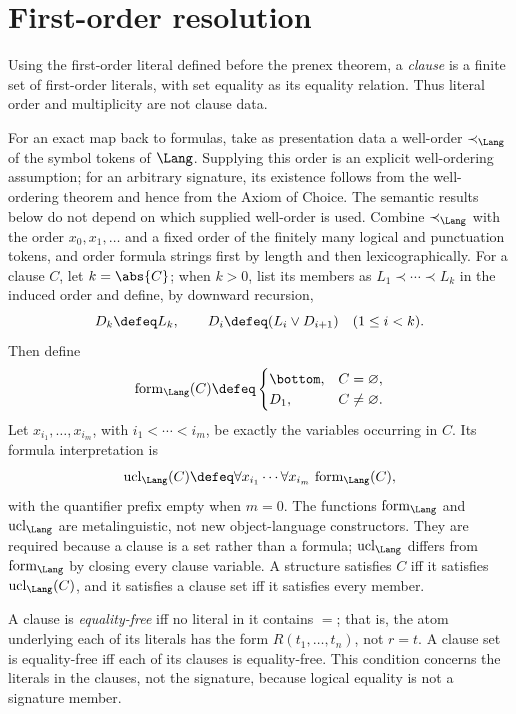 \section{First-order resolution}
\label{sec:fol-cardinality-normalforms-04}

\begin{definition}
Using the first-order literal defined before the prenex theorem, a
\emph{clause} is a finite set of first-order literals, with
set equality as its equality relation.  Thus literal order and multiplicity
are not clause data.

For an exact map back to formulas, take as presentation data a well-order
\(\prec_{\Lang}\) of the symbol tokens of \(\Lang\).  Supplying this order is
an explicit well-ordering assumption; for an arbitrary signature,
its existence follows from the well-ordering theorem and hence from the Axiom
of Choice.  The semantic results below do not depend on which supplied
well-order is used.  Combine \(\prec_{\Lang}\) with the order
\(x_0,x_1,\ldots\) and a fixed order of
the finitely many logical and punctuation tokens, and order formula strings
first by length and then lexicographically.  For a clause \(C\), let
\(k=\abs{C}\); when \(k>0\), list its members as
\(L_1\prec\cdots\prec L_k\) in the induced order and define, by downward
recursion,
\[
 D_k\defeq L_k,
 \qquad
 D_i\defeq(L_i\lor D_{i+1})\quad(1\leq i<k).
\]
Then define
\[
 \operatorname{form}_{\Lang}(C)\defeq
 \begin{cases}
  \bottom,&C=\varnothing,\\
  D_1,&C\ne\varnothing.
 \end{cases}
\]
Let \(x_{i_1},\ldots,x_{i_m}\), with
\(i_1<\cdots<i_m\), be exactly the variables occurring in \(C\).  Its
formula interpretation is
\[
 \operatorname{ucl}_{\Lang}(C)\defeq
 \forall x_{i_1}\cdots\forall x_{i_m}\,
 \operatorname{form}_{\Lang}(C),
\]
with the quantifier prefix empty when \(m=0\).  The functions
\(\operatorname{form}_{\Lang}\) and \(\operatorname{ucl}_{\Lang}\) are
metalinguistic, not new object-language constructors.  They are required
because a clause is a set rather than a formula;
\(\operatorname{ucl}_{\Lang}\) differs from \(\operatorname{form}_{\Lang}\)
by closing every clause variable.  A structure satisfies \(C\) iff it
satisfies \(\operatorname{ucl}_{\Lang}(C)\), and it satisfies a clause set
iff it satisfies every member.

A clause is \emph{equality-free} iff no literal in it contains \(=\); that is,
the atom underlying each of its literals has the form
\(R(t_1,\ldots,t_n)\), not \(r=t\).  A clause set is equality-free iff each
of its clauses is equality-free.  This condition concerns the literals in
the clauses, not the signature, because logical equality is not a signature
member.
\end{definition}

